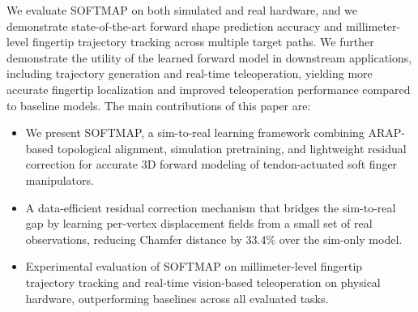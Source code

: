\documentclass[letterpaper, 10 pt, conference]{ieeeconf}  %
\newcommand{\algname}{SOFTMAP\xspace}
\begin{document}
We evaluate \algname on both simulated and real hardware, and we demonstrate state-of-the-art forward shape prediction accuracy and millimeter-level fingertip trajectory tracking across multiple target paths. We further demonstrate the utility of the learned forward model in downstream applications, including trajectory generation and real-time teleoperation, yielding more accurate fingertip localization and improved teleoperation performance compared to baseline models. The main contributions of this paper are:
\begin{itemize}
    \item We present \algname, a sim-to-real learning framework combining ARAP-based topological alignment, simulation pretraining, and lightweight residual correction for accurate 3D forward modeling of tendon-actuated soft finger manipulators.
    \item A data-efficient residual correction mechanism that bridges the sim-to-real gap by learning per-vertex displacement fields from a small set of real observations, reducing Chamfer distance by 33.4\% over the sim-only model.
    \item Experimental evaluation of \algname on millimeter-level fingertip trajectory tracking and real-time vision-based teleoperation on physical hardware, outperforming baselines across all evaluated tasks.
\end{itemize}
\end{document}
